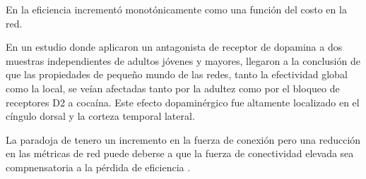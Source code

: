 En \textcite{Achard2007} la eficiencia incrementó monotónicamente como una función del costo en la red.

En un estudio donde aplicaron un antagonista de receptor de dopamina a dos muestras independientes de adultos jóvenes y mayores, \textcite{Achard2007} llegaron a la conclusión de que las propiedades de pequeño mundo de las redes, tanto la efectividad global como la local, se veían afectadas tanto por la adultez como por el bloqueo de receptores D2 a cocaína. Este efecto dopaminérgico fue altamente localizado en el cíngulo dorsal y la corteza temporal lateral.

La paradoja de tenero un incremento en la fuerza de conexión pero una reducción en las métricas de red puede deberse a que la fuerza de conectividad elevada sea compnensatoria a la pérdida de eficiencia \parencite{Wang2015a}.




